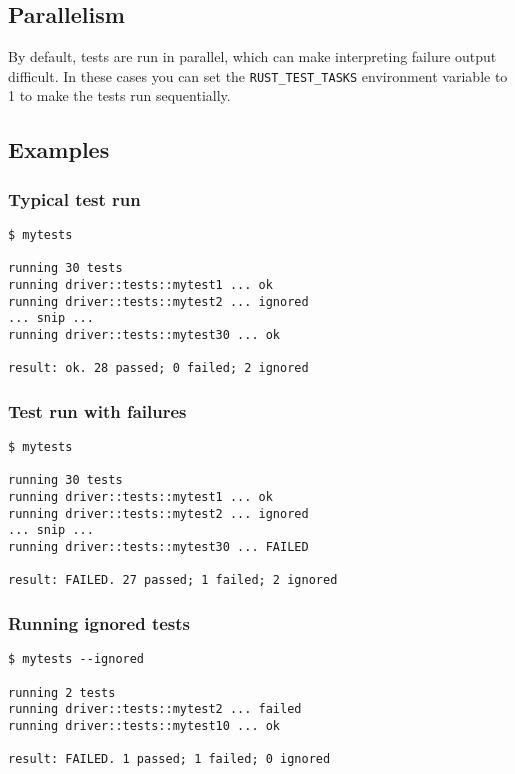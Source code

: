 \documentclass[]{article}
\begin{document}
\subsection{Parallelism}\label{parallelism}

By default, tests are run in parallel, which can make interpreting
failure output difficult. In these cases you can set the
\texttt{RUST\_TEST\_TASKS} environment variable to 1 to make the tests
run sequentially.

\subsection{Examples}\label{examples}

\subsubsection{Typical test run}\label{typical-test-run}

\begin{verbatim}
$ mytests

running 30 tests
running driver::tests::mytest1 ... ok
running driver::tests::mytest2 ... ignored
... snip ...
running driver::tests::mytest30 ... ok

result: ok. 28 passed; 0 failed; 2 ignored
\end{verbatim}

\subsubsection{Test run with failures}\label{test-run-with-failures}

\begin{verbatim}
$ mytests

running 30 tests
running driver::tests::mytest1 ... ok
running driver::tests::mytest2 ... ignored
... snip ...
running driver::tests::mytest30 ... FAILED

result: FAILED. 27 passed; 1 failed; 2 ignored
\end{verbatim}

\subsubsection{Running ignored tests}\label{running-ignored-tests}

\begin{verbatim}
$ mytests --ignored

running 2 tests
running driver::tests::mytest2 ... failed
running driver::tests::mytest10 ... ok

result: FAILED. 1 passed; 1 failed; 0 ignored
\end{verbatim}
\end{document}
